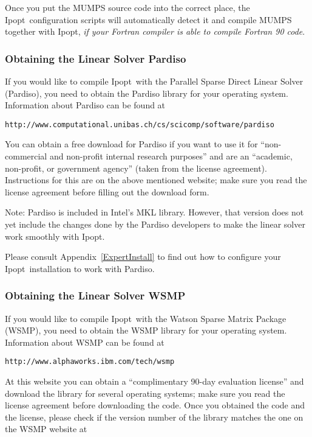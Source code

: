 \documentclass[10pt]{article}
\newcommand{\Ipopt}{{\sc Ipopt}}
\begin{document}
Once you put the MUMPS source code into the correct place, the \Ipopt\
configuration scripts will automatically detect it and compile MUMPS
together with \Ipopt, \emph{if your Fortran compiler is able to compile
Fortran 90 code}.


\subsubsection{Obtaining the Linear Solver Pardiso}\label{sec:Pardiso}

If you would like to compile \Ipopt\ with the Parallel Sparse Direct
Linear Solver (Pardiso), you need to obtain the Pardiso library for
your operating system.  Information about Pardiso can be found at

\texttt{http://www.computational.unibas.ch/cs/scicomp/software/pardiso}

You can obtain a free download for Pardiso if you want to use it for
``non-commercial and non-profit internal research purposes'' and are
an ``academic, non-profit, or government agency'' (taken from the
license agreement).  Instructions for this are on the above mentioned
website; make sure you read the license agreement before filling out
the download form.

Note: Pardiso is included in Intel's MKL library.  However, that
version does not yet include the changes done by the Pardiso
developers to make the linear solver work smoothly with \Ipopt.

Please consult Appendix~\ref{ExpertInstall} to find out how to
configure your \Ipopt\ installation to work with Pardiso.

\subsubsection{Obtaining the Linear Solver WSMP}\label{sec:WSMP}

If you would like to compile \Ipopt\ with the Watson Sparse Matrix
Package (WSMP), you need to obtain the WSMP library for your operating
system.  Information about WSMP can be found at

\texttt{http://www.alphaworks.ibm.com/tech/wsmp}

At this website you can obtain a ``complimentary 90-day evaluation
license'' and download the library for several operating systems; make
sure you read the license agreement before downloading the code.  Once
you obtained the code and the license, please check if the version
number of the library matches the one on the WSMP website at
\end{document}
